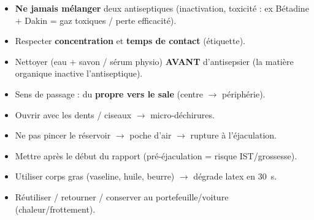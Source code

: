 \documentclass[11pt]{article}
\begin{document}
\begin{bilan}
\begin{attention}
\begin{itemize}
\item \textbf{Ne jamais mélanger} deux antiseptiques (inactivation, toxicité : ex Bétadine + Dakin = gaz toxiques / perte efficacité).
\item Respecter \textbf{concentration} et \textbf{temps de contact} (étiquette).
\item Nettoyer (eau + savon / sérum physio) \textbf{AVANT} d'antisepsier (la matière organique inactive l'antiseptique).
\item Sens de passage : du \textbf{propre vers le sale} (centre $\rightarrow$ périphérie).
\end{itemize}
\end{attention}

\begin{attention}
\begin{itemize}
\item Ouvrir avec les dents / ciseaux $\rightarrow$ micro-déchirures.
\item Ne pas pincer le réservoir $\rightarrow$ poche d'air $\rightarrow$ rupture à l'éjaculation.
\item Mettre après le début du rapport (pré-éjaculation = risque IST/grossesse).
\item Utiliser corps gras (vaseline, huile, beurre) $\rightarrow$ dégrade latex en \SI{30}{\second}.
\item Réutiliser / retourner / conserver au portefeuille/voiture (chaleur/frottement).
\end{itemize}
\end{attention}

\end{bilan}
\end{document}
